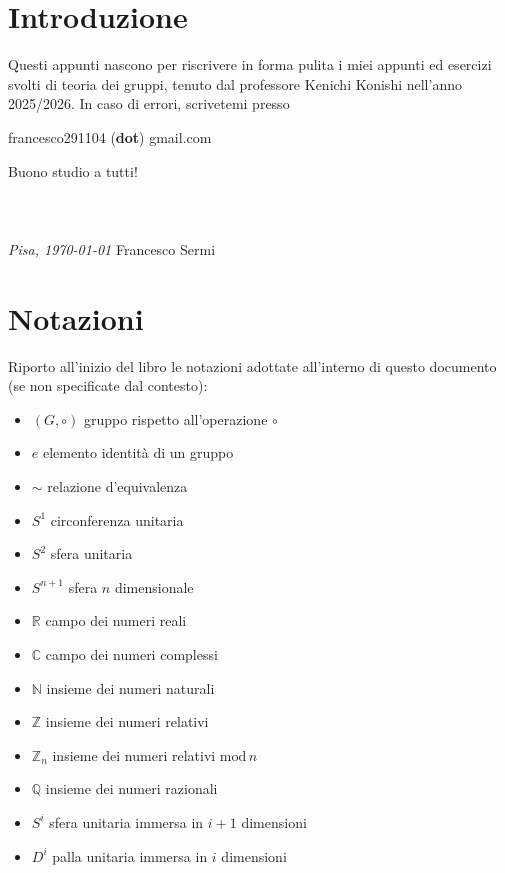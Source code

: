 \documentclass[12pt, twoside, italian]{book}
\begin{document}
	\chapter*{Introduzione}
	\pagestyle{empty}
	\thispagestyle{empty}
	\pagestyle{fancy}
	Questi appunti nascono per riscrivere in forma pulita i miei appunti ed esercizi svolti di teoria dei gruppi, tenuto dal professore Kenichi Konishi nell'anno 2025/2026. In caso di errori, scrivetemi presso
	\begin{center}
		francesco291104 (\textbf{dot}) gmail.com
	\end{center}

	Buono studio a tutti! \\ \\ \\ \\
	\emph{Pisa, \today} \hfill Francesco Sermi\
	\vfill
	\cleardoublepage
	\chapter*{Notazioni}
	\pagestyle{empty}
	\thispagestyle{empty}
	\pagestyle{fancy}

	Riporto all'inizio del libro le notazioni adottate all'interno di questo documento (se non specificate dal contesto):
 	\begin{itemize}
		\item $(G, \circ)$ gruppo rispetto all'operazione $\circ$
		\item $e$ elemento identità di un gruppo
		\item $\sim$ relazione d'equivalenza
		\item $S^1$ circonferenza unitaria
		\item $S^2$ sfera unitaria
		\item $S^{n+1}$ sfera $n$ dimensionale
		\item $\mathbb{R}$ campo dei numeri reali
		\item $\mathbb{C}$ campo dei numeri complessi
		\item $\mathbb{N}$ insieme dei numeri naturali
		\item $\mathbb{Z}$ insieme dei numeri relativi
		\item $\mathbb{Z}_n$ insieme dei numeri relativi $\text{mod} \, n$
		\item $\mathbb{Q}$ insieme dei numeri razionali
		\item $S^i$ sfera unitaria immersa in $i+1$ dimensioni
		\item $D^i$ palla unitaria immersa in $i$ dimensioni
	\end{itemize}
	\newpage
	
	
	\newpage
	\pagebreak
	\newpage
	\clearpage
	\cleardoublepage
	\pagestyle{plain}
	\thispagestyle{empty}
	\pagestyle{empty}
	\appendix
	
\end{document}
